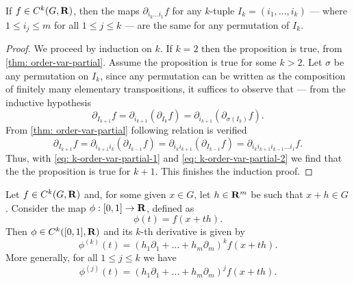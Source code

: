 \begin{corollary}\label{cor: k-order-var-partial}
    If \(f \in C^k(G, \mathbf{R})\), then the maps \(\partial_{i_k \dots i_1} f\) for any
    \(k\)-tuple \(I_k = (i_1, \dots, i_k)\) --- where \(1 \leq i_j \leq m\) for
    all \(1 \leq j \leq k\) --- are the same for any permutation of \(I_k\).
\end{corollary}

\begin{proof}
    We proceed by induction on \(k\). If \(k = 2\) then the proposition is true,
    from \cref{thm: order-var-partial}. Assume the proposition is true for some
    \(k > 2\). Let \(\sigma\) be any permutation on \(I_k\), since any permutation
    can be written as the composition of finitely many elementary transpositions,
    it suffices to observe that --- from the inductive hypothesis
    \begin{equation}\label{eq: k-order-var-partial-1}
        \partial_{I_{k+1}} f
        = \partial_{i_{k+1}} \left( \partial_{I_k} f \right)
        = \partial_{i_{k+1}} \left( \partial_{\sigma(I_k)} f \right).
    \end{equation}
    From \cref{thm: order-var-partial} following relation is verified
    \begin{equation}\label{eq: k-order-var-partial-2}
        \partial_{I_{k+1}} f
        = \partial_{i_{k+1} i_k} \left( \partial_{I_{k-1}} f \right)
        = \partial_{i_k i_{k+1}} \left( \partial_{I_{k-1}} f \right)
        = \partial_{i_k i_{k+1} i_{k-1} \dots i_1} f.
    \end{equation}
    Thus, with \cref{eq: k-order-var-partial-1} and \cref{eq:
        k-order-var-partial-2} we find that the the proposition is true for \(k + 1\).
    This finishes the induction proof.
\end{proof}

\begin{example}\label{ex: taylor-auxiliar}
    Let \(f \in C^k(G, \mathbf{R})\) and, for some given \(x \in G\), let \(h \in \mathbf{R}^m\) be
    such that \(x + h \in G\). Consider the map \(\phi: [0, 1] \to \mathbf{R}\), defined as
    \[
        \phi(t) = f(x + th).
    \]
    Then \(\phi \in C^k([0, 1], \mathbf{R})\) and its \(k\)-th derivative is given by
    \[
        \phi^{(k)}(t) = (h_1 \partial_1 + \dots + h_m \partial_m)^k f(x + th).
    \]
    More generally, for all \(1 \leq j \leq k\) we have
    \[
        \phi^{(j)}(t) = (h_1 \partial_1 + \dots + h_m \partial_m)^j f(x + th).
    \]
\end{example}

